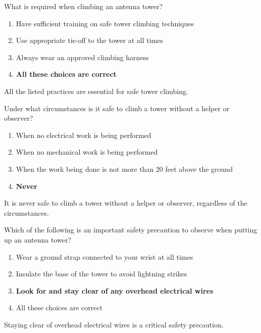 \begin{tcolorbox}[colback=gray!10!white,colframe=black!75!black,title={T0B02}]
What is required when climbing an antenna tower?
\begin{enumerate}[label=\Alph*),noitemsep]
    \item Have sufficient training on safe tower climbing techniques
    \item Use appropriate tie-off to the tower at all times
    \item Always wear an approved climbing harness
    \item \textbf{All these choices are correct}
\end{enumerate}
\end{tcolorbox}
All the listed practices are essential for safe tower climbing.

\begin{tcolorbox}[colback=gray!10!white,colframe=black!75!black,title={T0B03}]
Under what circumstances is it safe to climb a tower without a helper or observer?
\begin{enumerate}[label=\Alph*),noitemsep]
    \item When no electrical work is being performed
    \item When no mechanical work is being performed
    \item When the work being done is not more than 20 feet above the ground
    \item \textbf{Never}
\end{enumerate}
\end{tcolorbox}
It is never safe to climb a tower without a helper or observer, regardless of the circumstances.

\begin{tcolorbox}[colback=gray!10!white,colframe=black!75!black,title={T0B04}]
Which of the following is an important safety precaution to observe when putting up an antenna tower?
\begin{enumerate}[label=\Alph*),noitemsep]
    \item Wear a ground strap connected to your wrist at all times
    \item Insulate the base of the tower to avoid lightning strikes
    \item \textbf{Look for and stay clear of any overhead electrical wires}
    \item All these choices are correct
\end{enumerate}
\end{tcolorbox}
Staying clear of overhead electrical wires is a critical safety precaution.

